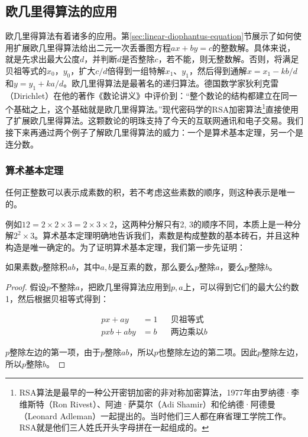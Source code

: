 \documentclass[b5paper]{ctexart}
\begin{document}
\subsection{欧几里得算法的应用}

欧几里得算法有着诸多的应用。第\ref{sec:linear-diophantus-equation}节展示了如何使用扩展欧几里得算法给出二元一次丢番图方程$ax + by = c$的整数解。具体来说，就是先求出最大公度$d$，并判断$d$是否整除$c$，若不能，则无整数解。否则，将满足贝祖等式的$x_0$，$y_0$，扩大$c/d$倍得到一组特解$x_1$、$y_1$，然后得到通解$x = x_1 - k b / d$和$y = y_1 + k a / d$。欧几里得算法是最著名的递归算法。德国数学家狄利克雷（Dirichlet）在他的著作《数论讲义》中评价到：“整个数论的结构都建立在同一个基础之上，这个基础就是欧几里得算法。”现代密码学的RSA加密算法\footnote{RSA算法是最早的一种公开密钥加密的非对称加密算法，1977年由罗纳德·李维斯特（Ron Rivest）、阿迪·萨莫尔（Adi Shamir）和伦纳德·阿德曼（Leonard Adleman）一起提出的。当时他们三人都在麻省理工学院工作。RSA就是他们三人姓氏开头字母拼在一起组成的。}直接使用了扩展欧几里得算法。这颗数论的明珠支持了今天的互联网通讯和电子交易。我们接下来再通过两个例子了解欧几里得算法的威力：一个是算术基本定理，另一个是连分数。

\label{sec:fundamental-theorem-of-arithmetic}
\subsubsection{算术基本定理}
\begin{theorem}[算术基本定理]
任何正整数可以表示成素数的积，若不考虑这些素数的顺序，则这种表示是唯一的。
\end{theorem}

例如$12 = 2 \times 2 \times 3 = 2 \times 3 \times 2$，这两种分解只有2, 3的顺序不同，本质上是一种分解$2^2 \times 3$。算术基本定理明确地告诉我们，素数是构成整数的基本砖石，并且这种构造是唯一确定的。为了证明算术基本定理，我们第一步先证明：

\begin{lemma}[欧几里得]
如果素数$p$整除积$ab$，其中$a, b$是互素的数，那么要么$p$整除$a$，要么$p$整除$b$。
\end{lemma}

\begin{proof}
假设$p$不整除$a$，把欧几里得算法应用到$p, a$上，可以得到它们的最大公约数1，然后根据贝祖等式得到：

\begin{align*}
px + ay &= 1 && \text{贝祖等式} \\
pxb + aby & = b && \text{两边乘以}b
\end{align*}

$p$整除左边的第一项，由于$p$整除$ab$，所以$p$也整除左边的第二项。因此$p$整除左边，所以$p$整除$b$。
\end{proof}
\end{document}
